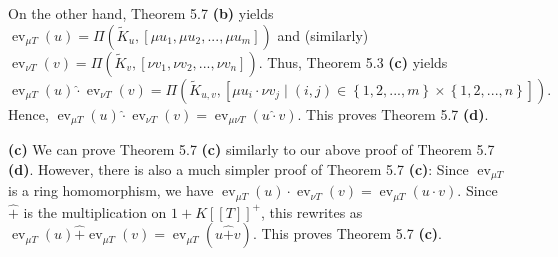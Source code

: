 \documentclass[numbers=enddot,12pt,final,onecolumn,notitlepage]{scrartcl}%
\begin{document}
On the other hand, Theorem 5.7 \textbf{(b)} yields $\operatorname*{ev}_{\mu
T}\left(  u\right)  =\Pi\left(  \widetilde{K}_{u},\left[  \mu u_{1},\mu
u_{2},...,\mu u_{m}\right]  \right)  $ and (similarly) $\operatorname*{ev}%
_{\nu T}\left(  v\right)  =\Pi\left(  \widetilde{K}_{v},\left[  \nu v_{1},\nu
v_{2},...,\nu v_{n}\right]  \right)  $. Thus, Theorem 5.3 \textbf{(c)} yields%
\[
\operatorname*{ev}\nolimits_{\mu T}\left(  u\right)  \widehat{\cdot
}\operatorname*{ev}\nolimits_{\nu T}\left(  v\right)  =\Pi\left(
\widetilde{K}_{u,v},\left[  \mu u_{i}\cdot\nu v_{j}\mid\left(  i,j\right)
\in\left\{  1,2,...,m\right\}  \times\left\{  1,2,...,n\right\}  \right]
\right)  .
\]
Hence, $\operatorname*{ev}_{\mu T}\left(  u\right)  \widehat{\cdot
}\operatorname*{ev}_{\nu T}\left(  v\right)  =\operatorname*{ev}_{\mu\nu
T}\left(  u\widehat{\cdot}v\right)  $. This proves Theorem 5.7 \textbf{(d)}.

\textbf{(c)} We can prove Theorem 5.7 \textbf{(c)} similarly to our above
proof of Theorem 5.7 \textbf{(d)}. However, there is also a much simpler proof
of Theorem 5.7 \textbf{(c)}: Since $\operatorname*{ev}\nolimits_{\mu T}$ is a
ring homomorphism, we have $\operatorname*{ev}\nolimits_{\mu T}\left(
u\right)  \cdot\operatorname*{ev}\nolimits_{\nu T}\left(  v\right)
=\operatorname*{ev}\nolimits_{\mu T}\left(  u\cdot v\right)  $. Since
$\widehat{+}$ is the multiplication on $1+K\left[  \left[  T\right]  \right]
^{+}$, this rewrites as $\operatorname*{ev}_{\mu T}\left(  u\right)
\widehat{+}\operatorname*{ev}_{\mu T}\left(  v\right)  =\operatorname*{ev}%
_{\mu T}\left(  u\widehat{+}v\right)  $. This proves Theorem 5.7 \textbf{(c)}.
\end{document}
